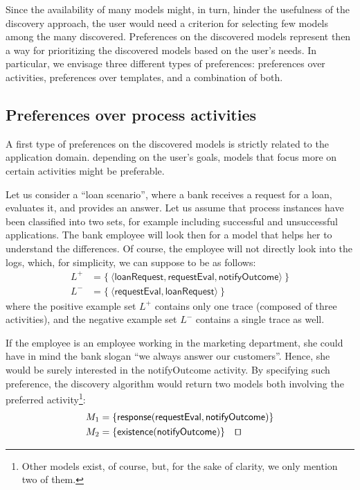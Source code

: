 Since the availability of many models might, in turn, hinder the usefulness of the discovery approach, the  user would need a criterion for selecting few models among the many discovered.
%
Preferences on the discovered models represent then a way for prioritizing the discovered models based on the  user's needs. In particular, we envisage three different types of preferences: preferences over activities, preferences over templates, and a combination of both.



\subsection{Preferences over process activities}
\label{subsec:prefOverActivities}

A first type of preferences on the discovered models is strictly related to the application domain.   depending on the  user's goals, models that focus more on certain activities might be preferable.

\begin{example}
\label{ex:prefOverActivities}
Let us consider a ``loan scenario'', where a bank receives a request for a loan, evaluates it, and provides an answer. Let us assume that process instances have been classified into two sets, for example including successful and unsuccessful applications. The bank employee will look then for a model that helps her to understand the differences. Of course, the employee will not directly look into the logs, which, for simplicity, we can suppose to be as follows:
%
\begin{align*}
L^{+}& = \{\ \langle \mathsf{loanRequest}, \mathsf{requestEval}, \mathsf{notifyOutcome} \rangle \ \} \\
L^- & = \{\ \langle \mathsf{requestEval}, \mathsf{loanRequest} \rangle \ \}
\end{align*}
%
where the positive example set $L^+$ %
contains only one trace (composed of
 three activities), and the negative example set $L^-$ %
 contains a single trace as well.

\noindent If the employee is an employee working in the marketing department, she could have in mind the bank slogan ``we always answer our customers''. Hence, she would be surely interested in the \textsf{notifyOutcome} activity. By specifying such preference, the discovery algorithm would return two models both involving the preferred activity\footnote{Other models exist, of course, but, for the sake of clarity, we only mention two of them.}:
%
\begin{align*}
M_1 & = \{ \mathsf{response(requestEval, notifyOutcome)}\} \\
M_2 & = \{ \mathsf{existence(notifyOutcome)}\} \quad \qed
\end{align*}
%
\end{example}

